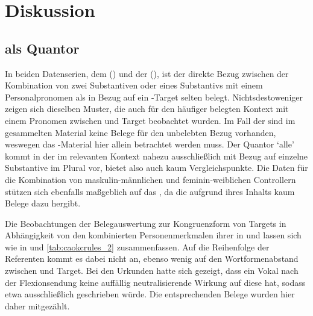 \chapter{Diskussion}
\label{ch:diskussion}

\section{ als Quantor}
\label{sec:beidequant}

In beiden Datenserien, dem 
(\CAO{}) und der  (\KC{}), ist der direkte Bezug zwischen
der Kombination von zwei Substantiven oder eines Substantivs mit einem
Personalpronomen als  in Bezug auf ein -Target
selten belegt. Nichtsdestoweniger zeigen sich dieselben Muster, die auch für
den häufiger belegten Kontext mit einem Pronomen zwischen  und
Target beobachtet wurden. Im Fall der \KC{} sind im gesammelten Material keine
Belege für den unbelebten Bezug vorhanden, weswegen das \CAO{}-Material hier
allein betrachtet werden muss. Der Quantor  `alle'
\autocite[vgl.][606--621]{ksw2} kommt in der \KC{} im relevanten Kontext nahezu
ausschließlich mit Bezug auf einzelne Substan\-tive im Plural vor, bietet also
auch kaum Vergleichspunkte. Die Daten für die Kombination von
maskulin-männlichen und feminin-weiblichen Controllern stützen
sich ebenfalls maßgeblich auf das \CAO{}, da die \KC{} aufgrund ihres Inhalts
kaum Belege dazu hergibt.

Die Beobachtungen der Belegauswertung zur Kongruenzform von Targets in
Abhängigkeit von den kombinierten Personenmerkmalen ihrer  in
 und  lassen sich wie in
 und \ref{tab:caokcrules_2} zusammenfassen. Auf die
Reihenfolge der Referenten kommt es dabei nicht an, ebenso wenig auf den
Wortformenabstand zwischen  und Target.
Bei den Urkunden hatte sich gezeigt, dass ein Vokal nach der Flexionsendung
 keine auffällig neutrali\-sie\-rende Wirkung auf diese hat,
sodass etwa ausschließlich  geschrieben würde. Die entsprechenden
Belege wurden hier daher mitgezählt.

